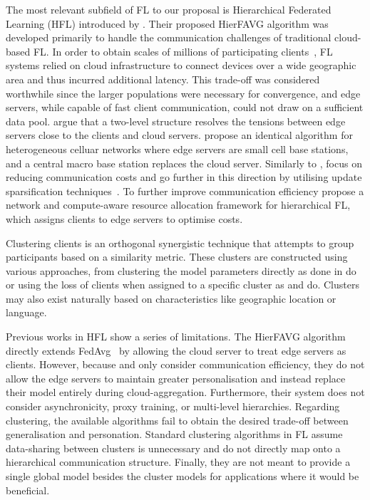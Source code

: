 The most relevant subfield of FL to our proposal is Hierarchical Federated Learning (HFL) introduced by \citet{Client-Edge-CloudHierFL}. Their proposed HierFAVG algorithm was developed primarily to handle the communication challenges of traditional cloud-based FL\@. In order to obtain scales of millions of participating clients~\citep{GoogleKeyboard, ScaleSystemDesign}, FL systems relied on cloud infrastructure to connect devices over a wide geographic area and thus incurred additional latency. This trade-off was considered worthwhile since the larger populations were necessary for convergence, and edge servers, while capable of fast client communication, could not draw on a sufficient data pool. \citet{Client-Edge-CloudHierFL} argue that a two-level structure resolves the tensions between edge servers close to the clients and cloud servers. \citet{Hier_Het_Cellular} propose an identical algorithm for heterogeneous celluar networks where edge servers are small cell base stations, and a central macro base station replaces the cloud server. Similarly to \citet{Client-Edge-CloudHierFL}, \citet{Hier_Het_Cellular} focus on reducing communication costs and go further in this direction by utilising update sparsification techniques~\citep{DeepGradientCompressin,CommCompressionDecent}. To further improve communication efficiency \citet{HFELJointEdgeResource} propose a network and compute-aware resource allocation framework for hierarchical FL, which assigns clients to edge servers to optimise costs.

Clustering clients is an orthogonal synergistic technique that attempts to group participants based on a similarity metric. These clusters are constructed using various approaches, from clustering the model parameters directly as done in \citet{ClusterFL} do or using the loss of clients when assigned to a specific cluster as \citet{ThreeApproachesMansour} and \citet{AnEfficientFrameworkForClusteredFL} do. Clusters may also exist naturally based on characteristics like geographic location or language.



Previous works in HFL show a series of limitations. The HierFAVG algorithm directly extends FedAvg~\citep{FedAvg} by allowing the cloud server to treat edge servers as clients. However, because \citet{Client-Edge-CloudHierFL} and \citet{Hier_Het_Cellular} only consider communication efficiency, they do not allow the edge servers to maintain greater personalisation and instead replace their model entirely during cloud-aggregation. Furthermore, their system does not consider asynchronicity, proxy training, or multi-level hierarchies. Regarding clustering, the available algorithms fail to obtain the desired trade-off between generalisation and personation. Standard clustering algorithms in FL assume data-sharing between clusters is unnecessary and do not directly map onto a hierarchical communication structure. Finally, they are not meant to provide a single global model besides the cluster models for applications where it would be beneficial.



